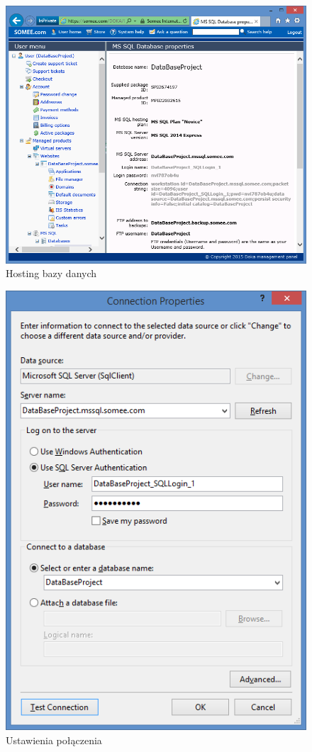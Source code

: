\documentclass[a4paper,11pt]{article}
\begin{document}
\begin{figure}[h!]
	\centering
	\includegraphics[width=\textwidth,height=0.6\textheight]{db1.png}
	\caption{Hosting bazy danych}
\end{figure}
\begin{figure}[h!]
	\centering
	\includegraphics[width=\textwidth,height=0.6\textheight]{db3.png}
	\caption{Ustawienia połączenia}
\end{figure}
\end{document}
